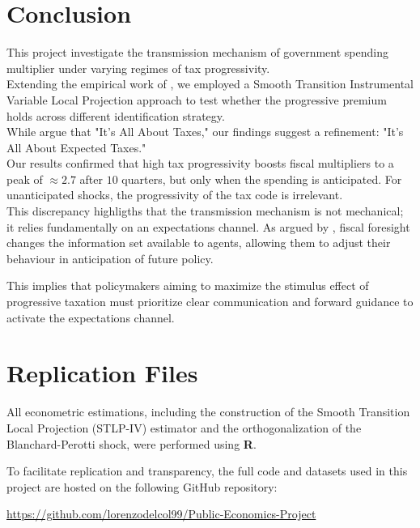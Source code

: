 \documentclass[12pt,letterpaper]{article}
\begin{document}
\section{Conclusion}
This project investigate the transmission mechanism of government spending multiplier under varying regimes of tax progressivity.
\\
Extending the empirical work of \cite{FN}, we employed a Smooth Transition Instrumental Variable Local Projection approach to test whether the progressive premium holds across different identification strategy.
\\
While \cite{FN} argue that "It's All About Taxes," our findings suggest a refinement: "It's All About Expected Taxes." 
\\
Our results confirmed that high tax progressivity boosts fiscal multipliers to a peak of $\approx 2.7$ after $10$ quarters, but only when the spending is anticipated. For unanticipated shocks, the progressivity of the tax code is irrelevant. 
\\
This discrepancy highligths that the transmission mechanism is not mechanical; it relies fundamentally on an expectations channel. As argued by \cite{Ascari}, fiscal foresight changes the information set available to agents, allowing them to adjust their behaviour in anticipation of future policy.

This implies that policymakers aiming to maximize the stimulus effect of progressive taxation must prioritize clear communication and forward guidance to activate the expectations channel.


\clearpage



\section{Replication Files}
\label{app:code}

All econometric estimations, including the construction of the Smooth Transition Local Projection (STLP-IV) estimator and the orthogonalization of the Blanchard-Perotti shock, were performed using \textbf{R}.

To facilitate replication and transparency, the full code and datasets used in this project are hosted on the following GitHub repository:

\begin{center}
    \url{https://github.com/lorenzodelcol99/Public-Economics-Project}
\end{center}
\end{document}
